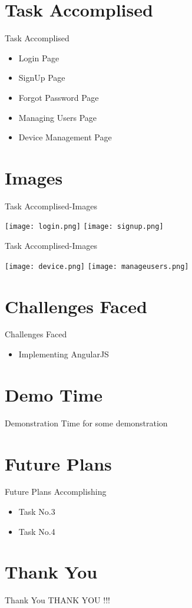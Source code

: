 \documentclass[10pt, a4paper]{beamer}
\begin{document}
\section{Task Accomplised}
\begin{frame}{Task Accomplised}
	\begin{itemize}
		\item Login Page
		\item SignUp Page
		\item Forgot Password Page
		\item Managing Users Page
		\item Device Management Page
		
	\end{itemize}
\end{frame}

\section{Images}
\begin{frame}{Task Accomplised-Images}
    
	\texttt{[image: login.png]}
	\texttt{[image: signup.png]}
	
\end{frame}

\begin{frame}{Task Accomplised-Images}
    
	\texttt{[image: device.png]}
	\texttt{[image: manageusers.png]}
	
\end{frame}



\section{Challenges Faced}
\begin{frame}{Challenges Faced}
	\begin{itemize}
		\item Implementing AngularJS  
	\end{itemize}
\end{frame}

\section{Demo Time}
\begin{frame}{Demonstration}
	Time for some demonstration
\end{frame}

\section{Future Plans}
\begin{frame}{Future Plans}
	Accomplishing 
	\begin{itemize}
	    \item Task No.3
	    \item Task No.4
	\end{itemize}
	    
	 
\end{frame}


\section{Thank You}
\begin{frame}{Thank You}
	\centering THANK YOU !!!
\end{frame}
\end{document}
